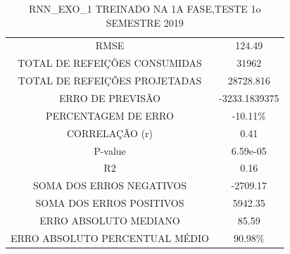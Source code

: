             \begin{table}[!ht]
            \centering
            \caption{RNN\_EXO\_1 TREINADO NA 1A FASE,TESTE 1o SEMESTRE 2019}
            \label{table:case1_rnn_exo_1}
                \begin{tabular}{|c|c|}
                \rowcolor{gray!50}
                \hline
            \multicolumn{2}{c}{RNN\_EXO\_1 TREINADO NA 1A FASE,TESTE 1o SEMESTRE 2019} \\
            \hline
            RMSE & 124.49\\
            TOTAL DE REFEIÇÕES CONSUMIDAS & 31962 \\
            TOTAL DE REFEIÇÕES PROJETADAS & 28728.816  \\
            ERRO DE PREVISÃO & -3233.1839375 \\
            PERCENTAGEM DE ERRO & -10.11\%  \\
            CORRELAÇÃO (r) & 0.41 \\ 
            P-value & 6.59e-05\\ 
            R2 & 0.16\\
            SOMA DOS ERROS NEGATIVOS & -2709.17\\
            SOMA DOS ERROS POSITIVOS & 5942.35\\
            ERRO ABSOLUTO MEDIANO & 85.59\\
            ERRO ABSOLUTO PERCENTUAL MÉDIO & 90.98\% \\ \hline \end{tabular} \end{table}
        
